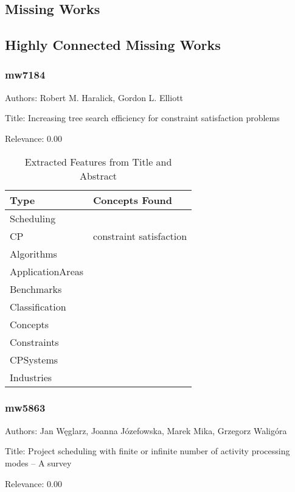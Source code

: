 \subsection{Missing Works}

\subsection{Highly Connected Missing Works}

\subsubsection{mw7184}
\label{mw:mw7184}

Authors: Robert M. Haralick, Gordon L. Elliott

Title: Increasing tree search efficiency for constraint satisfaction problems

Relevance:  0.00

{\scriptsize
\begin{longtable}{p{2cm}p{20cm}}
\caption{Extracted Features from Title and Abstract}\\ \toprule
Type & Concepts Found\\ \midrule
\endhead
\bottomrule
\endfoot
Scheduling & \\ 
CP & constraint satisfaction\\ 
Algorithms & \\ 
ApplicationAreas & \\ 
Benchmarks & \\ 
Classification & \\ 
Concepts & \\ 
Constraints & \\ 
CPSystems & \\ 
Industries & \\ 
\end{longtable}
}



\subsubsection{mw5863}
\label{mw:mw5863}

Authors: Jan Węglarz, Joanna Józefowska, Marek Mika, Grzegorz Waligóra

Title: Project scheduling with finite or infinite number of activity processing modes – A survey

Relevance:  0.00

